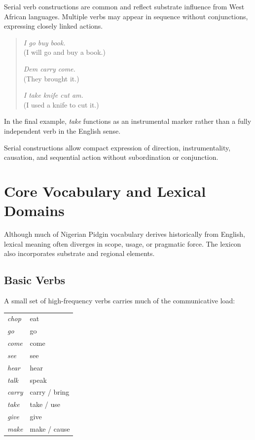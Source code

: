 \documentclass[12pt]{article}
\begin{document}
Serial verb constructions are common and reflect substrate influence from West African languages. Multiple verbs may appear in sequence without conjunctions, expressing closely linked actions.

\begin{quote}
\textit{I go buy book.} \\
(I will go and buy a book.)

\textit{Dem carry come.} \\
(They brought it.)

\textit{I take knife cut am.} \\
(I used a knife to cut it.)
\end{quote}

In the final example, \textit{take} functions as an instrumental marker rather than a fully independent verb in the English sense.

Serial constructions allow compact expression of direction, instrumentality, causation, and sequential action without subordination or conjunction.

\section{Core Vocabulary and Lexical Domains}

Although much of Nigerian Pidgin vocabulary derives historically from English, lexical meaning often diverges in scope, usage, or pragmatic force. The lexicon also incorporates substrate and regional elements.

\subsection{Basic Verbs}

A small set of high-frequency verbs carries much of the communicative load:

\begin{center}
\begin{tabular}{ll}
\textit{chop} & eat \\
\textit{go} & go \\
\textit{come} & come \\
\textit{see} & see \\
\textit{hear} & hear \\
\textit{talk} & speak \\
\textit{carry} & carry / bring \\
\textit{take} & take / use \\
\textit{give} & give \\
\textit{make} & make / cause \\
\end{tabular}
\end{center}
\end{document}
